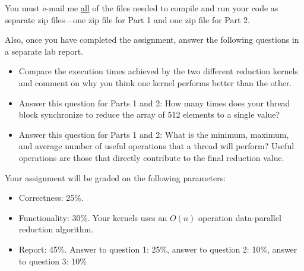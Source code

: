 \documentclass[11.5pt]{article}
\begin{document}
\noindent You must e-mail me \underline{all} of the files needed to compile and run your code as separate zip files---one zip file for Part 1 and one zip file for Part 2.
\vspace{12pt}

\noindent Also, once you have completed the assignment, answer the following questions in a separate lab report.
\begin{itemize}
\item Compare the execution times achieved by the two different reduction kernels and comment on why you think one kernel performs better than the other.

\item Answer this question for Parts 1 and 2: How many times does your thread block synchronize to reduce the array of 512 elements to a single value?

\item Answer this question for Parts 1 and 2: What is the minimum, maximum, and average number of useful operations that a thread will perform?  Useful operations are those that directly contribute to the final reduction value.
\end{itemize}
\vspace{12pt}

\noindent Your assignment will be graded on the following parameters:
\begin{itemize}
\item Correctness: 25\%.
\item Functionality: 30\%. Your kernels uses an $O(n)$ operation data-parallel reduction algorithm.
\item Report: 45\%. Answer to question 1: 25\%, answer to question 2: 10\%, answer to question 3: 10\%
\end{itemize}
\end{document}
